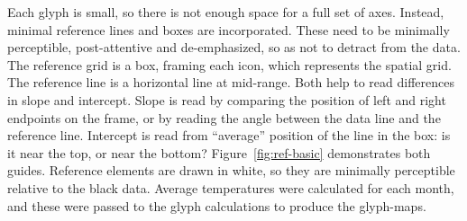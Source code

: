 \documentclass[oneside]{article}
\begin{document}
Each glyph is small, so there is not enough space for a full set of axes. Instead, minimal reference lines and boxes are incorporated. These need to be minimally perceptible, post-attentive \citep{healey} and de-emphasized, so as not to detract from the data. The reference grid is a box, framing each icon, which represents the spatial grid. The reference line is a horizontal line at mid-range. Both help to read differences in slope and intercept. Slope is read by comparing the position of left and right endpoints on the frame, or by reading the angle between the data line and the reference line. Intercept is read from ``average'' position of the line in the box: is it near the top, or near the bottom? Figure~\ref{fig:ref-basic} demonstrates both guides. Reference elements are drawn in white, so they are minimally perceptible relative to the black data. Average temperatures were calculated for each month, and these were passed to the glyph calculations to produce the glyph-maps.   


\end{document}
